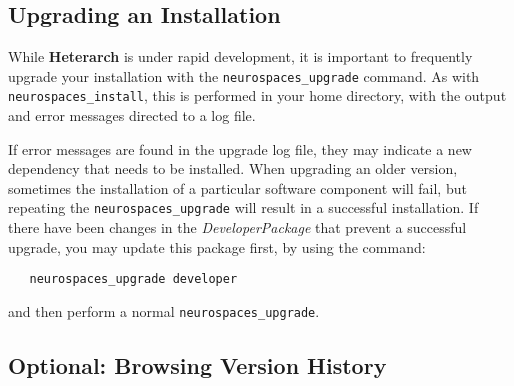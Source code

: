 \documentclass[12pt]{article}
\begin{document}




\subsection*{Upgrading an Installation}

While {\bf\small{Heterarch}} is under rapid development, it is important to frequently
upgrade your installation with the {\tt neurospaces\_upgrade} command.
As with {\tt neurospaces\_install}, this is performed in your home
directory, with the output and error messages directed to a log file.

If error messages are found in the upgrade log file, they may indicate
a new dependency that needs to be installed.  When upgrading an older
version, sometimes the installation of a particular software component
will fail, but repeating the {\tt neurospaces\_upgrade} will result in a
successful installation.  If there have been changes in the {\it
  DeveloperPackage} that prevent a successful upgrade, you may update
this package first, by using the command:

\begin{verbatim}
   neurospaces_upgrade developer
\end{verbatim}
and then perform a normal {\tt neurospaces\_upgrade}.
 
\subsection*{Optional: Browsing Version History}
\end{document}
